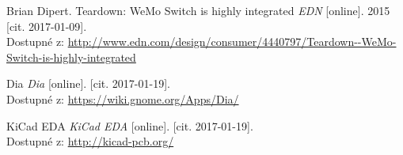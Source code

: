 \documentclass[12pt,a4paper,oneside]{article}
\begin{document}
\begin{thebibliography}{99}
Brian Dipert. Teardown: WeMo Switch is highly integrated \emph{EDN} [online]. 2015 [cit. 2017-01-09]. \\ Dostupné z: \url{http://www.edn.com/design/consumer/4440797/Teardown--WeMo-Switch-is-highly-integrated}

Dia \emph{Dia} [online]. [cit. 2017-01-19]. \\ Dostupné z: \url{https://wiki.gnome.org/Apps/Dia/}

KiCad EDA \emph{KiCad EDA} [online]. [cit. 2017-01-19]. \\ Dostupné z: \url{http://kicad-pcb.org/}

\end{thebibliography}

\newpage

\listoffigures


\listoftables

\end{document}
